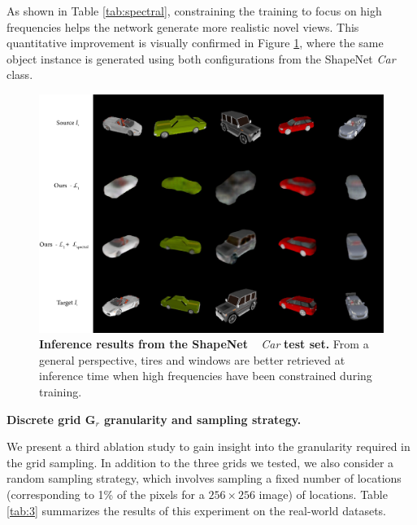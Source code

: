 As shown in Table \ref{tab:spectral}, constraining the training to focus on high frequencies helps the network generate more realistic novel views. This quantitative improvement is visually confirmed in Figure \ref{fig:spectral_res}, where the same object instance is generated using both configurations from the ShapeNet \textit{Car} class.\newline 

\begin{figure}[h!]
    \begin{center}
    \includegraphics[width=\textwidth]{images/epipolarnvs/CarSpectral_New.png}
    \end{center}
     \caption{\textbf{Inference results from the ShapeNet} ~\cite{chang2015shapenet} \textit{Car} \textbf{test set.} From a general perspective, tires and windows are better retrieved at inference time when high frequencies have been constrained during training.}
     \label{fig:spectral_res}
\end{figure}

\textbf{Discrete grid $\textbf{G}_{r}$ granularity and sampling strategy.}

We present a third ablation study to gain insight into the granularity required in the grid sampling. In addition to the three grids we tested, we also consider a random sampling strategy, which involves sampling a fixed number of locations (corresponding to 1\% of the pixels for a $256\times 256$ image) of locations. Table \ref{tab:3} summarizes the results of this experiment on the real-world datasets.

